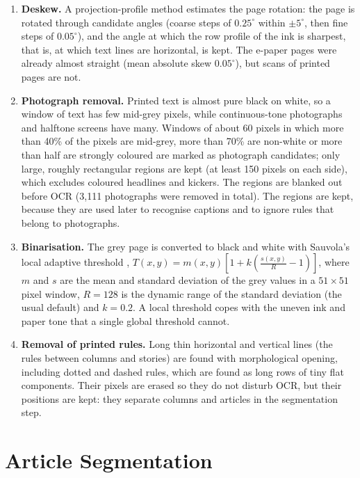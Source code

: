 \begin{enumerate}
\item \textbf{Deskew.} A projection-profile method estimates the page rotation: the page is rotated through candidate angles (coarse steps of $0.25^{\circ}$ within $\pm 5^{\circ}$, then fine steps of $0.05^{\circ}$), and the angle at which the row profile of the ink is sharpest, that is, at which text lines are horizontal, is kept. The e-paper pages were already almost straight (mean absolute skew $0.05^{\circ}$), but scans of printed pages are not.
\item \textbf{Photograph removal.} Printed text is almost pure black on white, so a window of text has few mid-grey pixels, while continuous-tone photographs and halftone screens have many. Windows of about 60 pixels in which more than 40\% of the pixels are mid-grey, more than 70\% are non-white or more than half are strongly coloured are marked as photograph candidates; only large, roughly rectangular regions are kept (at least 150 pixels on each side), which excludes coloured headlines and kickers. The regions are blanked out before OCR (3,111 photographs were removed in total). The regions are kept, because they are used later to recognise captions and to ignore rules that belong to photographs.
\item \textbf{Binarisation.} The grey page is converted to black and white with Sauvola's local adaptive threshold \cite{sauvola2000}, $T(x,y) = m(x,y)\left[1 + k\left(\frac{s(x,y)}{R} - 1\right)\right]$, where $m$ and $s$ are the mean and standard deviation of the grey values in a $51\times 51$ pixel window, $R = 128$ is the dynamic range of the standard deviation (the usual default) and $k = 0.2$. A local threshold copes with the uneven ink and paper tone that a single global threshold cannot.
\item \textbf{Removal of printed rules.} Long thin horizontal and vertical lines (the rules between columns and stories) are found with morphological opening, including dotted and dashed rules, which are found as long rows of tiny flat components. Their pixels are erased so they do not disturb OCR, but their positions are kept: they separate columns and articles in the segmentation step.
\end{enumerate}

\section{Article Segmentation}
\label{sec:segment}

